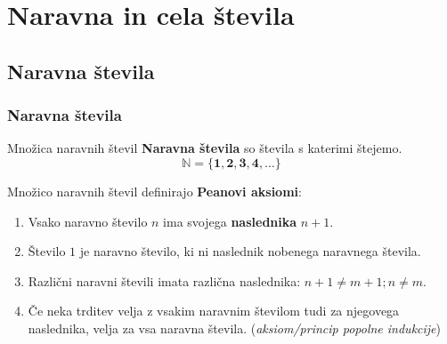 \section{Naravna in cela števila}

\begin{frame}
    \sectionpage
\end{frame}

\begin{frame}
\end{frame}
        
    \subsection{Naravna števila}

        \begin{frame}
            \frametitle{Naravna števila}

                \begin{alertblock}{Množica naravnih števil}
                    \textbf{Naravna števila} so števila s katerimi štejemo.
                    $$\mathbf{\mathbb{N}=\{1, 2, 3, 4, \ldots\}}$$
                \end{alertblock}

                \begin{block}{}
                    Množico naravnih števil definirajo \textbf{Peanovi aksiomi}:
                    \begin{enumerate}
                        \item Vsako naravno število $n$ ima svojega \textbf{naslednika} $n+1$.
                        \item Število $1$ je naravno število, ki ni naslednik nobenega naravnega števila.
                        \item Različni naravni števili imata različna naslednika: $n+1 \neq m+1; n \neq m$.
                        \item Če neka trditev velja z vsakim naravnim številom tudi za njegovega naslednika, velja za vsa naravna števila. (\textit{aksiom/princip popolne indukcije})
                    \end{enumerate}

                \end{block}
        \end{frame}

